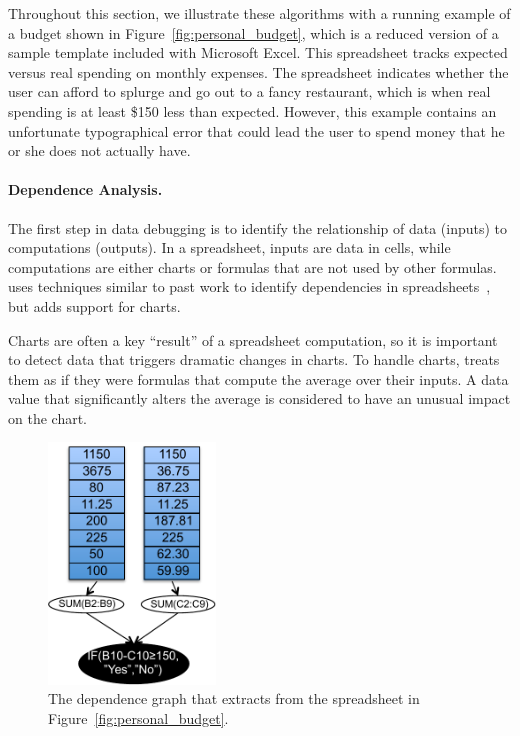 Throughout this section, we illustrate these algorithms with a running
example of a budget shown in Figure~\ref{fig:personal_budget}, which
is a reduced version of a sample template included with Microsoft Excel. This
spreadsheet tracks expected versus real spending on monthly
expenses. The spreadsheet indicates whether the user can afford to
splurge and go out to a fancy restaurant, which is when real spending
is at least \$150 less than expected. However, this example contains
an unfortunate typographical error that could lead the user to spend
money that he or she does not actually have.


\paragraph{Dependence Analysis.}
The first step in data debugging is to identify the relationship of
data (inputs) to computations (outputs).
In a spreadsheet, inputs are data in cells, while computations are
either charts or formulas that are not used by other formulas.
\checkcell{} uses techniques similar to past work to identify
dependencies in spreadsheets~\cite{fisher2006scaling}, but adds
support for charts.

Charts are often a key ``result'' of a spreadsheet computation, so it
is important to detect data that triggers dramatic changes in
charts. To handle charts, \checkcell{} treats them as if they were
formulas that compute the average over their inputs. A data value that
significantly alters the average is considered to have an
unusual impact on the chart.

\begin{figure}[!t]
\centering
\includegraphics[width=1.75in]{dependence-graph}
\caption{The dependence graph that \checkcell{} extracts from the spreadsheet in Figure~\ref{fig:personal_budget}.\label{fig:dependence-graph}}
\end{figure}

